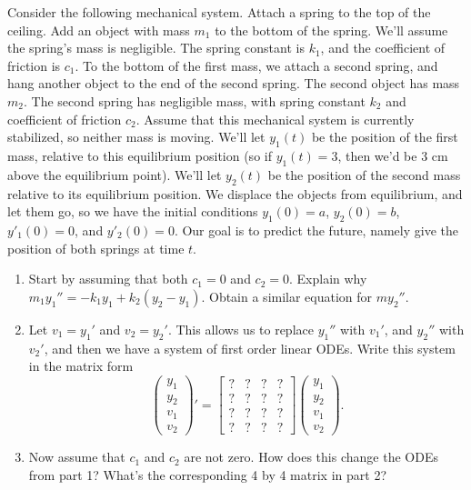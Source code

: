 \begin{problem}
Consider the following mechanical system.  Attach a spring to the top of the ceiling. Add an object with mass $m_1$ to the bottom of the spring. We'll assume the spring's mass is negligible. The spring constant is $k_1$, and the coefficient of friction is $c_1$. To the bottom of the first mass, we attach a second spring, and hang another object to the end of the second spring.  The second object has mass $m_2$. The second spring has negligible mass, with spring constant $k_2$ and coefficient of friction $c_2$. Assume that this mechanical system is currently stabilized, so neither mass is moving.  We'll let $y_1(t)$ be the position of the first mass, relative to this equilibrium position (so if $y_1(t)=3$, then we'd be 3 cm above the equilibrium point).  We'll let $y_2(t)$ be the position of the second mass relative to its equilibrium position.  We displace the objects from equilibrium, and let them go, so we have the initial conditions $y_1(0)=a$, $y_2(0)=b$, $y'_1(0)=0$, and $y'_2(0)=0$. Our goal is to predict the future, namely give the position of both springs at time $t$.   
\begin{enumerate}
 \item Start by assuming that both $c_1=0$ and $c_2=0$. 
Explain why $m_1y_1'' = -k_1 y_1 +k_2(y_2-y_1)$. Obtain a similar equation for $my_2''$.
 \item Let $v_1=y_1'$ and $v_2=y_2'$. This allows us to replace $y_1''$ with $v_1'$, and $y_2''$ with $v_2'$, and then we have a system of first order linear ODEs.  Write this system in the matrix form 
$$
\begin{pmatrix}
 y_1\\y_2\\v_1\\v_2
\end{pmatrix}'
=
\begin{bmatrix}
 ?&?&?&?\\
 ?&?&?&?\\
 ?&?&?&?\\
 ?&?&?&?
\end{bmatrix}
\begin{pmatrix}
 y_1\\y_2\\v_1\\v_2
\end{pmatrix}.
$$
\item Now assume that $c_1$ and $c_2$ are not zero.  How does this change the ODEs from part 1?  What's the corresponding 4 by 4 matrix in part 2?
\end{enumerate}
\end{problem}












